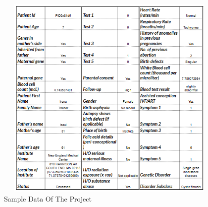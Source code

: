 \begin{figure}[htpb]
\begin{center}
\includegraphics[height=10cm, width=12cm]{figures/sample.png}
\caption{Sample Data Of The Project}
\label{fig 1}
\end{center}
\end{figure}
